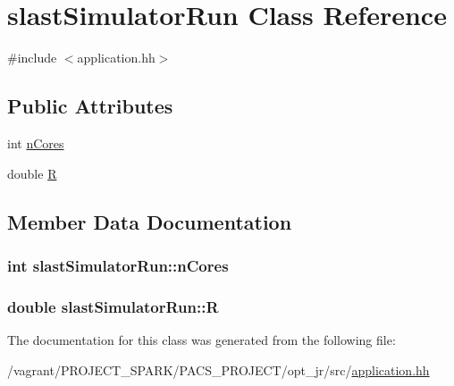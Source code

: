 \hypertarget{classslastSimulatorRun}{\section{slast\-Simulator\-Run Class Reference}
\label{classslastSimulatorRun}
}


{\ttfamily \#include $<$application.\-hh$>$}

\subsection*{Public Attributes}
\begin{DoxyCompactItemize}
\item 
int \hyperlink{classslastSimulatorRun_a709891b6cab0506a591c1979f1001561}{n\-Cores}
\item 
double \hyperlink{classslastSimulatorRun_a0f5480e725b0d25893d8b983d5971d5e}{R}
\end{DoxyCompactItemize}


\subsection{Member Data Documentation}
\hypertarget{classslastSimulatorRun_a709891b6cab0506a591c1979f1001561}{
\subsubsection[{n\-Cores}]{\setlength{\rightskip}{0pt plus 5cm}int slast\-Simulator\-Run\-::n\-Cores}}\label{classslastSimulatorRun_a709891b6cab0506a591c1979f1001561}
\hypertarget{classslastSimulatorRun_a0f5480e725b0d25893d8b983d5971d5e}{
\subsubsection[{R}]{\setlength{\rightskip}{0pt plus 5cm}double slast\-Simulator\-Run\-::\-R}}\label{classslastSimulatorRun_a0f5480e725b0d25893d8b983d5971d5e}


The documentation for this class was generated from the following file\-:\begin{DoxyCompactItemize}
\item 
/vagrant/\-P\-R\-O\-J\-E\-C\-T\-\_\-\-S\-P\-A\-R\-K/\-P\-A\-C\-S\-\_\-\-P\-R\-O\-J\-E\-C\-T/opt\-\_\-jr/src/\hyperlink{application_8hh}{application.\-hh}\end{DoxyCompactItemize}
